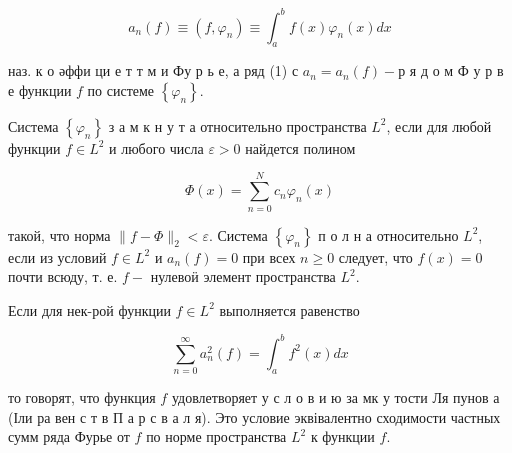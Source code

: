 \documentclass[10pt]{article}
\begin{document}
\[
a_{n}(f) \equiv\left(f, \varphi_{n}\right) \equiv \int_{a}^{b} f(x) \varphi_{n}(x) d x
\]

наз. к о әффи ци е т т м и Фу р ь е, а ряд (1) с $a_{n}=a_{n}(f)-р$ я д о м Ф у р в е функции $f$ по системе $\left\{\varphi_{n}\right\}$.

Система $\left\{\varphi_{n}\right\}$ з а м к н у т а относительно пространства $L^{2}$, если для любой функции $f \in L^{2}$ и любого числа $\varepsilon>0$ найдется полином

\[
\Phi(x)=\sum_{n=0}^{N} c_{n} \varphi_{n}(x)
\]

такой, что норма $\|f-\Phi\|_{2}<\varepsilon$. Система $\left\{\varphi_{n}\right\}$ п о л н а относительно $L^{2}$, если из условий $f \in L^{2}$ и $a_{n}(f)=0$ при всех $n \geqslant 0$ следует, что $f(x)=0$ почти всюду, т. е. $f-$ нулевоӥ элемент пространства $L^{2}$.

Если для нек-рой функции $f \in L^{2}$ выполняется равенство

\[
\sum_{n=0}^{\infty} a_{n}^{2}(f)=\int_{a}^{b} f^{2}(x) d x
\]

то говорят, что функция $f$ удовлетворяет у с л о в и ю за мк у тости Ля пунов а (Іли ра вен с т в П а р с в а л я). Это условие эквівалентно сходимости частных сумм ряда Фурье от $f$ по норме пространства $L^{2}$ к функции $f$.
\end{document}
